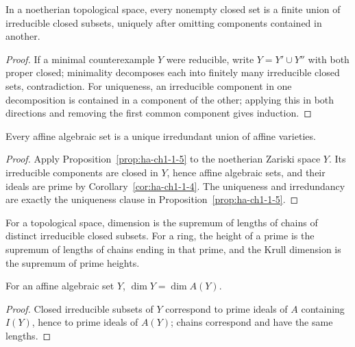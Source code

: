 \begin{proposition}
\label{prop:ha-ch1-1-5}
In a noetherian topological space, every nonempty closed set is a finite union of irreducible
closed subsets, uniquely after omitting components contained in another.
\end{proposition}
\begin{proof}
If a minimal counterexample $Y$ were reducible, write $Y=Y'\cup Y''$ with both proper closed;
minimality decomposes each into finitely many irreducible closed sets, contradiction.  For
uniqueness, an irreducible component in one decomposition is contained in a component of the
other; applying this in both directions and removing the first common component gives induction.
\end{proof}

\begin{corollary}
\label{cor:ha-ch1-1-6}
Every affine algebraic set is a unique irredundant union of affine varieties.
\end{corollary}
\begin{proof}
Apply Proposition~\ref{prop:ha-ch1-1-5} to the noetherian Zariski space $Y$.  Its irreducible
components are closed in $Y$, hence affine algebraic sets, and their ideals are prime by
Corollary~\ref{cor:ha-ch1-1-4}.  The uniqueness and irredundancy are exactly the uniqueness clause
in Proposition~\ref{prop:ha-ch1-1-5}.
\end{proof}

For a topological space, dimension is the supremum of lengths of chains of distinct irreducible
closed subsets.  For a ring, the height of a prime is the supremum of lengths of chains ending in
that prime, and the Krull dimension is the supremum of prime heights.

\begin{proposition}
\label{prop:ha-ch1-1-7}
For an affine algebraic set $Y$, $\dim Y=\dim A(Y)$.
\end{proposition}
\begin{proof}
Closed irreducible subsets of $Y$ correspond to prime ideals of $A$ containing $I(Y)$, hence
to prime ideals of $A(Y)$; chains correspond and have the same lengths.
\end{proof}

